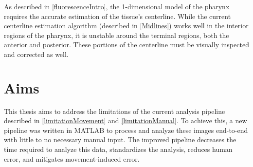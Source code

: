 As described in \ref{fluorescenceIntro}, the 1-dimensional model of the pharynx requires the accurate estimation of the tissue's centerline. While the current centerline estimation algorithm (described in \ref{Midlines}) works well in the interior regions of the pharynx, it is unstable around the terminal regions, both the anterior and posterior. These portions of the centerline must be visually inspected and corrected as well.

\section{Aims}
This thesis aims to address the limitations of the current analysis pipeline described in \ref{limitationMovement} and \ref{limitationManual}. To achieve this, a new pipeline was written in MATLAB to process and analyze these images end-to-end with little to no necessary manual input. The improved pipeline decreases the time required to analyze this data, standardizes the analysis, reduces human error, and mitigates movement-induced error.